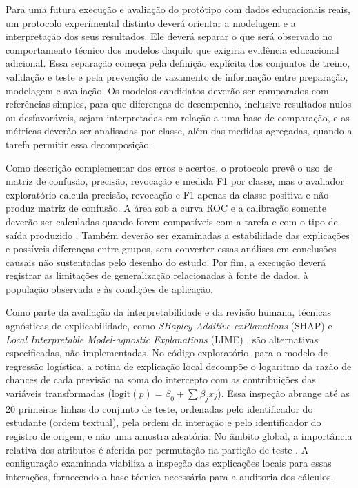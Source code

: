 

\label{sec:avaliacao-empirica-futura}

Para uma futura execução e avaliação do protótipo com dados educacionais reais, um protocolo experimental distinto deverá orientar a modelagem e a interpretação dos seus resultados. Ele deverá separar o que será observado no comportamento técnico dos modelos daquilo que exigiria evidência educacional adicional. Essa separação começa pela definição explícita dos conjuntos de treino, validação e teste e pela prevenção de vazamento de informação entre preparação, modelagem e avaliação. Os modelos candidatos deverão ser comparados com referências simples, para que diferenças de desempenho, inclusive resultados nulos ou desfavoráveis, sejam interpretadas em relação a uma base de comparação, e as métricas deverão ser analisadas por classe, além das medidas agregadas, quando a tarefa permitir essa decomposição.

Como descrição complementar dos erros e acertos, o protocolo prevê o uso de matriz de confusão, precisão, revocação e medida F1 por classe, mas o avaliador exploratório calcula precisão, revocação e F1 apenas da classe positiva e não produz matriz de confusão. A área sob a curva ROC e a calibração somente deverão ser calculadas quando forem compatíveis com a tarefa e com o tipo de saída produzido \cite{Fawcett2006,NiculescuMizilCaruana2005}. Também deverão ser examinadas a estabilidade das explicações e possíveis diferenças entre grupos, sem converter essas análises em conclusões causais não sustentadas pelo desenho do estudo. Por fim, a execução deverá registrar as limitações de generalização relacionadas à fonte de dados, à população observada e às condições de aplicação.

Como parte da avaliação da interpretabilidade e da revisão humana, técnicas agnósticas de explicabilidade, como \textit{SHapley Additive exPlanations} (SHAP) e \textit{Local Interpretable Model-agnostic Explanations} (LIME) \cite{LundbergLee2017,RibeiroSinghGuestrin2016}, são alternativas especificadas, não implementadas. No código exploratório, para o modelo de regressão logística, a rotina de explicação local decompõe o logaritmo da razão de chances de cada previsão na soma do intercepto com as contribuições das variáveis transformadas ($\mbox{logit}(p) = \beta_0 + \sum \beta_j x_j$). Essa inspeção abrange até as 20 primeiras linhas do conjunto de teste, ordenadas pelo identificador do estudante (ordem textual), pela ordem da interação e pelo identificador do registro de origem, e não uma amostra aleatória. No âmbito global, a importância relativa dos atributos é aferida por permutação na partição de teste \cite{Breiman2001}. A configuração examinada viabiliza a inspeção das explicações locais para essas interações, fornecendo a base técnica necessária para a auditoria dos cálculos.

